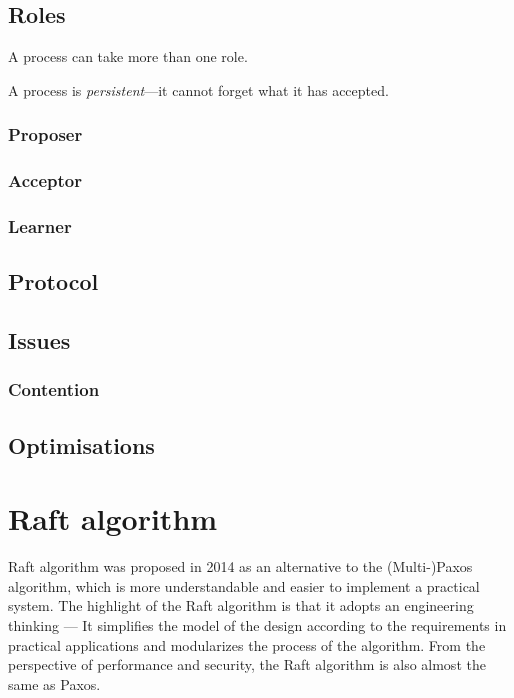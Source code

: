 \documentclass[12pt, a4paper]{article}
\begin{document}
\subsection{Roles}

A process can take more than one role.

A process is \textit{persistent}---it cannot forget what it has accepted.

  \subsubsection{Proposer}

  \subsubsection{Acceptor}

  \subsubsection{Learner}

\subsection{Protocol}

\subsection{Issues}

  \subsubsection{Contention}

\subsection{Optimisations}



\section{Raft algorithm}
Raft algorithm was proposed in 2014\cite{conf/usenix/OngaroO14} as an alternative to the (Multi-)Paxos algorithm, which is more
understandable and easier to implement a practical system. The highlight of the Raft algorithm is that it adopts an
engineering thinking --- It simplifies the model of the design according to the requirements in practical applications and
modularizes the process of the algorithm. From the perspective of performance and security, the Raft algorithm is also almost
the same as Paxos.
\end{document}
